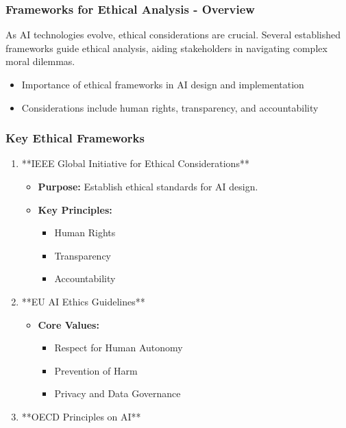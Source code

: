 \documentclass[aspectratio=169]{beamer}
\begin{document}
\begin{frame}[fragile]
    \frametitle{Frameworks for Ethical Analysis - Overview}
    As AI technologies evolve, ethical considerations are crucial. Several established frameworks guide ethical analysis, aiding stakeholders in navigating complex moral dilemmas.

    \begin{itemize}
        \item Importance of ethical frameworks in AI design and implementation
        \item Considerations include human rights, transparency, and accountability
    \end{itemize}
\end{frame}

\begin{frame}[fragile]
    \frametitle{Key Ethical Frameworks}
    \begin{enumerate}
        \item **IEEE Global Initiative for Ethical Considerations**
            \begin{itemize}
                \item \textbf{Purpose:} Establish ethical standards for AI design.
                \item \textbf{Key Principles:}
                    \begin{itemize}
                        \item Human Rights
                        \item Transparency
                        \item Accountability
                    \end{itemize}
            \end{itemize}
        \item **EU AI Ethics Guidelines**
            \begin{itemize}
                \item \textbf{Core Values:}
                    \begin{itemize}
                        \item Respect for Human Autonomy
                        \item Prevention of Harm
                        \item Privacy and Data Governance
                    \end{itemize}
            \end{itemize}
        \item **OECD Principles on AI**

\end{enumerate}
\end{frame}
\end{document}
